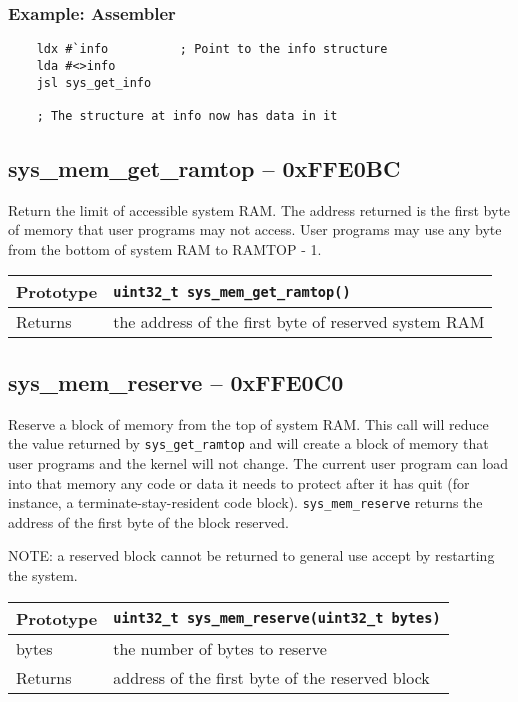 \subsubsection*{Example: Assembler}
\begin{verbatim}
    ldx #`info			; Point to the info structure
    lda #<>info
    jsl sys_get_info

    ; The structure at info now has data in it
\end{verbatim}


\subsection*{sys\_mem\_get\_ramtop -- 0xFFE0BC}
Return the limit of accessible system RAM. The address returned is the first byte of memory that user programs may not access. User programs may use any byte from the bottom of system RAM to RAMTOP - 1.

\bigskip

\begin{tabular}{|l||l|} \hline
Prototype & \lstinline!uint32_t sys_mem_get_ramtop()! \\ \hline
Returns & the address of the first byte of reserved system RAM \\ \hline
\end{tabular}


\subsection*{sys\_mem\_reserve -- 0xFFE0C0}
Reserve a block of memory from the top of system RAM. This call will reduce the value returned by \lstinline|sys_get_ramtop| and will create a block of memory that user programs and the kernel will not change.
The current user program can load into that memory any code or data it needs to protect after it has quit (for instance, a terminate-stay-resident code block). \lstinline|sys_mem_reserve| returns the address of the first byte of the block reserved.

NOTE: a reserved block cannot be returned to general use accept by restarting the system.

\bigskip

\begin{tabular}{|l||l|} \hline
Prototype & \lstinline!uint32_t sys_mem_reserve(uint32_t bytes)! \\ \hline
bytes & the number of bytes to reserve \\ \hline
Returns & address of the first byte of the reserved block \\ \hline
\end{tabular}

